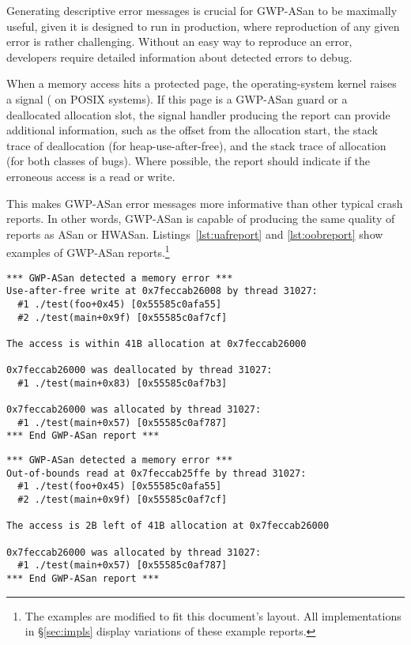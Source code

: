 Generating descriptive error messages is crucial for GWP-ASan to be maximally
useful, given it is designed to run in production, where reproduction of any
given error is rather challenging. Without an easy way to reproduce an error,
developers require detailed information about detected errors to debug.

When a memory access hits a protected page, the operating-system kernel raises
a signal ( on POSIX systems). If this page is a GWP-ASan guard
or a deallocated allocation slot, the signal handler producing the report can
provide additional information, such as the offset from the allocation start,
the stack trace of deallocation (for heap-use-after-free), and the stack trace
of allocation (for both classes of bugs). Where possible, the report should
indicate if the erroneous access is a read or write.

This makes GWP-ASan error messages more informative than other typical crash
reports. In other words, GWP-ASan is capable of producing the same quality of
reports as ASan or HWASan. Listings~\ref{lst:uafreport} and \ref{lst:oobreport}
show examples of GWP-ASan reports.\footnote{The examples are modified to fit
this document's layout. All implementations in \S\ref{sec:impls} display
variations of these example reports.}

\begin{lstlisting}[frame=single, caption=Example GWP-ASan use-after-free report.,
  label=lst:uafreport, basicstyle=\footnotesize]
*** GWP-ASan detected a memory error ***
Use-after-free write at 0x7feccab26008 by thread 31027:
  #1 ./test(foo+0x45) [0x55585c0afa55]
  #2 ./test(main+0x9f) [0x55585c0af7cf]

The access is within 41B allocation at 0x7feccab26000

0x7feccab26000 was deallocated by thread 31027:
  #1 ./test(main+0x83) [0x55585c0af7b3]

0x7feccab26000 was allocated by thread 31027:
  #1 ./test(main+0x57) [0x55585c0af787]
*** End GWP-ASan report ***
\end{lstlisting}

\begin{lstlisting}[frame=single, caption=Example GWP-ASan out-of-bounds report.,
  label=lst:oobreport, basicstyle=\footnotesize]
*** GWP-ASan detected a memory error ***
Out-of-bounds read at 0x7feccab25ffe by thread 31027:
  #1 ./test(foo+0x45) [0x55585c0afa55]
  #2 ./test(main+0x9f) [0x55585c0af7cf]

The access is 2B left of 41B allocation at 0x7feccab26000

0x7feccab26000 was allocated by thread 31027:
  #1 ./test(main+0x57) [0x55585c0af787]
*** End GWP-ASan report ***
\end{lstlisting}

